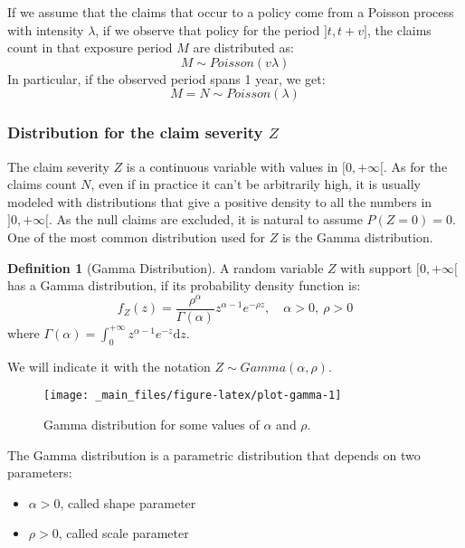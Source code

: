 \documentclass[a4paper, twoside, openright, 12pt]{report}
\providecommand{\tightlist}{%
  \setlength{\itemsep}{0pt}\setlength{\parskip}{0pt}}
\theoremstyle{definition}
\newtheorem{definition}{Definition}[chapter]
\theoremstyle{definition}
\theoremstyle{definition}
\theoremstyle{remark}
\begin{document}
If we assume that the claims that occur to a policy come from a Poisson process with intensity \(\lambda\), if we observe that policy for the period \(]t, t+v]\), the claims count in that exposure period \(M\) are distributed as:
\[ M\sim Poisson(v \lambda) \]
In particular, if the observed period spans 1 year, we get:
\[ M = N \sim Poisson(\lambda) \]

\hypertarget{distribution-for-the-claim-severity-z}{%
\subsubsection{\texorpdfstring{Distribution for the claim severity \(Z\)}{Distribution for the claim severity Z}}\label{distribution-for-the-claim-severity-z}}

The claim severity \(Z\) is a continuous variable with values in \([0, +\infty[\). As for the claims count \(N\), even if in practice it can't be arbitrarily high, it is usually modeled with distributions that give a positive density to all the numbers in \(]0, +\infty[\). As the null claims are excluded, it is natural to assume \(P\left( Z=0 \right) = 0\). One of the most common distribution used for \(Z\) is the Gamma distribution.

\begin{definition}[Gamma Distribution]
\label{def:def-gamma} \iffalse (Gamma Distribution) \fi{} A random variable \(Z\) with support \([0, +\infty[\) has a Gamma distribution, if its probability density function is:
\[
f_Z(z) = \frac{\rho^\alpha}{\Gamma(\alpha)}z^{\alpha-1}e^{-\rho z}, \quad \alpha > 0, \ \rho > 0
\]
where \(\Gamma(\alpha) = \int_{0}^{+\infty}{z^{\alpha - 1} e^{-z} \mathrm{d} z}\).

We will indicate it with the notation \(Z \sim Gamma(\alpha, \rho)\).
\end{definition}

\begin{figure}[!hbtp]

{\centering \texttt{[image: \_main\_files/figure-latex/plot-gamma-1]} 

}

\caption{Gamma distribution for some values of $\alpha$ and $\rho$.}\label{fig:plot-gamma}
\end{figure}

The Gamma distribution is a parametric distribution that depends on two parameters:

\begin{itemize}
\tightlist
\item
  \(\alpha > 0\), called shape parameter
\item
  \(\rho > 0\), called scale parameter
\end{itemize}
\end{document}
